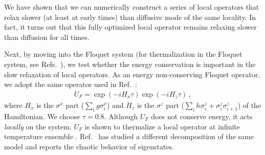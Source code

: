 \documentclass[twocolumn,superscriptaddress, prb]{revtex4-1}
\begin{document}
We have shown that we can numerically construct a series of local operators that relax slower (at least at early times) than
diffusive mode of the same locality. In fact, it turns out that this fully optimized local operator remains relaxing slower than diffusion for
all times.

Next, by moving into the Floquet system (for thermalization in the Floquet system, see Refs.~),
we test whether the energy conservation is important in the slow relaxation of local operators.
As an energy non-conserving Floquet operator, we adopt the same operator used in Ref.~:
\begin{align}
U_F = \exp(-i H_x \tau) \exp(-i H_z \tau) ~,
\end{align}
where $H_x$ is the $\sigma^x$ part ($\sum_i g \sigma^x_i$) and $H_z$ is the $\sigma^z$ part ($\sum_i h \sigma^z_i +\sigma^z_i \sigma^z_{i+1}$)
of the Hamiltonian. We choose $\tau = 0.8$.
Although $U_F$ does not conserve energy, it acts {\it locally} on the system.
$U_F$ is shown to thermalize a local operator at infinite temperature ensemble \cite{Kim_ETH}.
Ref.~ has studied a different decomposition of the same model and reports the chaotic behavior of eigenstates.
\end{document}
